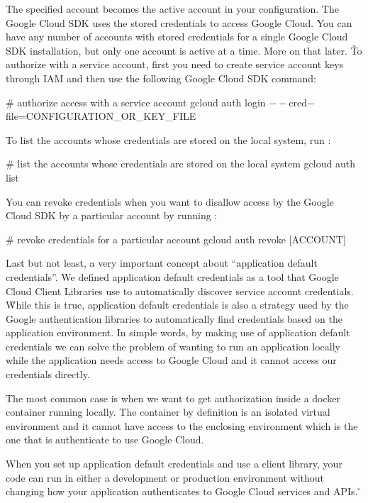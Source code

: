 The specified account becomes the active account in your configuration. The Google Cloud SDK uses the stored credentials
to access Google Cloud. You can have any number of accounts with stored credentials for a single Google Cloud SDK
installation, but only one account is active at a time. More on that later. \v

To authorize with a service account, first you need to create service account keys through IAM and then use the
following Google Cloud SDK command:
\begin{bash}
# authorize access with a service account
gcloud auth login $--$cred$-$file=CONFIGURATION\_OR\_KEY\_FILE
\end{bash}

To list the accounts whose credentials are stored on the local system, run :
\begin{bash}
# list the accounts whose credentials are stored on the local system
gcloud auth list
\end{bash}

You can revoke credentials when you want to disallow access by the Google Cloud SDK by a particular account by running
:
\begin{bash}
# revoke credentials for a particular account
gcloud auth revoke [ACCOUNT]
\end{bash}

Last but not least, a very important concept about ``application default credentials''. We defined application
default credentials as a tool that Google Cloud Client Libraries use to automatically discover service account
credentials. \v

While this is true, application default credentials is also a strategy used by the Google authentication libraries to
automatically find credentials based on the application environment. In simple words, by making use of application
default credentials we can solve the problem of wanting to run an application locally while the application needs
access to Google Cloud and it cannot access our credentials directly.

\be
The most common case is when we want to get authorization inside a docker container running locally. The container by
definition is an isolated virtual environment and it cannot have access to the enclosing environment which is the one
that is authenticate to use Google Cloud.
\ee

When you set up application default credentials and use a client library, your code can run in either a development
or production environment without changing how your application authenticates to Google Cloud services and APIs. \v

